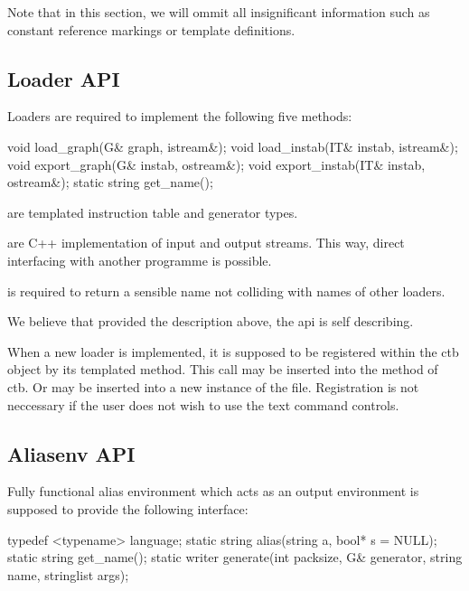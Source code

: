 Note that in this section, we will ommit all insignificant information such as constant reference markings or template definitions.

\subsection{Loader API}

Loaders are required to implement the following five methods:

\begin{code}
void load_graph(G& graph, istream&);
void load_instab(IT& instab, istream&);
void export_graph(G& instab, ostream&);
void export_instab(IT& instab, ostream&);
static string get_name();
\end{code}

\begin{description}
\item {} are templated instruction table and generator types.
\item {} are C++ implementation of input and output streams. This way, direct interfacing with another programme is possible.
\item {} is required to return a sensible name not colliding with names of other loaders.
\end{description}

We believe that provided the description above, the api is self describing.

When a new loader is implemented, it is supposed to be registered within the ctb object by its templated  method. This call may be inserted into the  method of ctb. Or may be inserted into a new instance of the  file. Registration is not neccessary if the user does not wish to use the text command controls.

\subsection{Aliasenv API}

Fully functional alias environment which acts as an output environment is supposed to provide the following interface:

\begin{code}
typedef <typename> language;
static string alias(string a, bool* s = NULL);
static string get_name();
static writer generate(int packsize,  G& generator, 
  string name, stringlist args);
\end{code}

